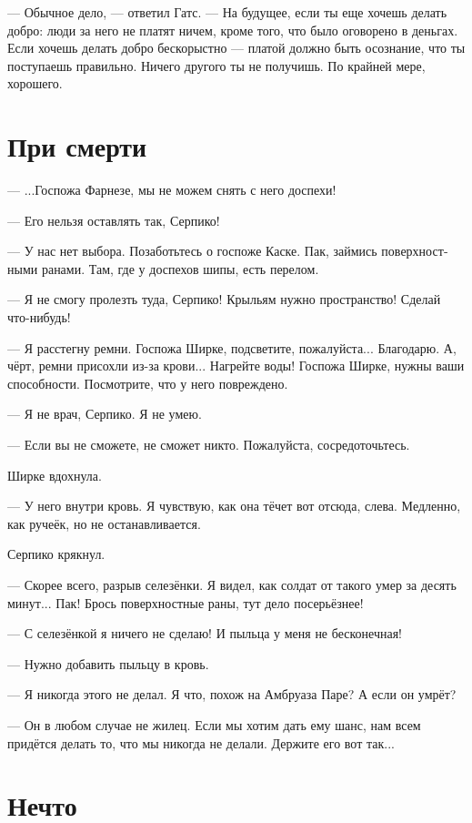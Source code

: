 \documentclass[a4paper,12pt,fleqn]{book}\usepackage{polyglossia}\setdefaultlanguage[babelshorthands=true]{russian}\setotherlanguage{english}\defaultfontfeatures{Ligatures=TeX,Mapping=tex-text}\usepackage{xcolor}\newcommand{\ml}[3]{#2}
\begin{document}
--- Обычное дело, --- ответил Гатс.
--- На будущее, если ты еще хочешь делать добро: люди за него не платят ничем, кроме того, что было оговорено в деньгах.
Если хочешь делать добро бескорыстно --- платой должно быть осознание, что ты поступаешь правильно.
Ничего другого ты не получишь.
По крайней мере, хорошего.

\section{При смерти}

--- ...Госпожа Фарнезе, мы не можем снять с него доспехи!

--- Его нельзя оставлять так, Серпико!

--- У нас нет выбора.
Позаботьтесь о госпоже Каске.
Пак, займись поверхностными ранами.
Там, где у доспехов шипы, есть перелом.

--- Я не смогу пролезть туда, Серпико!
Крыльям нужно пространство!
Сделай что-нибудь!

--- Я расстегну ремни.
Госпожа Ширке, подсветите, пожалуйста...
Благодарю.
А, чёрт, ремни присохли из-за крови...
Нагрейте воды!
Госпожа Ширке, нужны ваши способности.
Посмотрите, что у него повреждено.

--- Я не врач, Серпико.
Я не умею.

--- Если вы не сможете, не сможет никто.
Пожалуйста, сосредоточьтесь.

Ширке вдохнула.

--- У него внутри кровь.
Я чувствую, как она тёчет вот отсюда, слева.
Медленно, как ручеёк, но не останавливается.

Серпико крякнул.

--- Скорее всего, разрыв селезёнки.
Я видел, как солдат от такого умер за десять минут...
Пак!
Брось поверхностные раны, тут дело посерьёзнее!

--- С селезёнкой я ничего не сделаю!
И пыльца у меня не бесконечная!

--- Нужно добавить пыльцу в кровь.

--- Я никогда этого не делал.
Я что, похож на Амбруаза Паре?
А если он умрёт?

--- Он в любом случае не жилец.
Если мы хотим дать ему шанс, нам всем придётся делать то, что мы никогда не делали.
Держите его вот так...

\section{Нечто}
\end{document}
